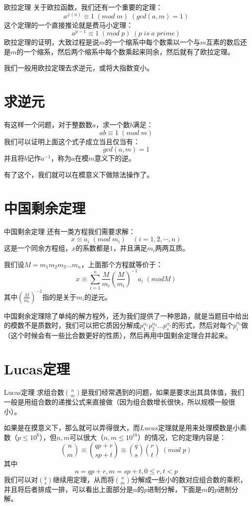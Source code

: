 \documentclass[9pt]{beamer}
\begin{document}
		\begin{frame}{欧拉定理}
			关于欧拉函数，我们还有一个重要的定理：
			$$
				a^{\varphi(n)} \equiv 1 \; (mod \; m)  \;(gcd(a,m) = 1)
			$$
			这个定理的一个直接推论就是费马小定理：
			$$
				a^{p-1} \equiv 1 \; (mod \; p) \; (p \; is \;  a \; prime)
			$$
			欧拉定理的证明，大致过程是说$m$的一个缩系中每个数乘以一个与$m$互素的数后还是$m$的一个缩系，然后两个缩系中每个数乘起来同余，然后就有了欧拉定理。
			
			我们一般用欧拉定理去求逆元，或将大指数变小。
		\end{frame} 
	\section{求逆元}  
		\begin{frame}
			有这样一个问题，对于整数数$a$，求一个数$b$满足：
			$$
			ab \equiv 1 \; (mod \; m)
			$$
			我们可以证明上面这个式子成立当且仅当有：
			$$
			gcd(a,m) = 1
			$$
			并且将$b$记作$a^{-1}$，称为$a$在模$m$意义下的逆。
			
			有了这个，我们就可以在模意义下做除法操作了。
		\end{frame}
	\section{中国剩余定理} 
		\begin{frame}{中国剩余定理} 
			还有一类方程我们需要求解：
			$$
				x \equiv a_i \; (mod \; m_i) \quad ( i = 1, 2, \cdots, n )
			$$
			这是一个同余方程组，$x$的系数都是$1$，并且满足$m_i$两两互质。
			
			我们设$M = m_1m_2m_3\dots m_n$，上面那个方程就等价于：
			$$
				x \equiv \sum_{i = 1}^{n} \frac{M}{m_i} (\frac{M}{m_i})^{-1}a_i \; (mod M)
			$$
			其中$(\frac{M}{m_i})^{-1}$指的是关于$m_i$的逆元。
			
			中国剩余定理除了单纯的解方程外，还为我们提供了一种思路，就是当题目中给出的模数不是质数时，我们可以把它质因分解成$p_1^{\alpha_1}p_2^{\alpha_2}\dots p_s^{\alpha_s}$的形式，然后对每个$p_i^{\alpha_i}$做（这个时候会有一些比合数更好的性质），然后再用中国剩余定理合并起来。
		\end{frame} 
	\section{Lucas定理}	 
		\begin{frame}{Lucas定理}	 
			求组合数$\binom{n}{m}$是我们经常遇到的问题，如果是要求出其具体值，我们一般是用组合数的递推公式来直接做（因为组合数增长很快，所以规模一般很小）。
			
			如果是在摸意义下，那么就可以弄得很大，而$Lucas$定理就是用来处理模数是小素数（$p \leq 10^6$），但$n,m$可以很大（$n,m \leq 10^{18}$）的情况，它的定理内容是：
			$$
				\binom{n}{m} \equiv \binom{qp+r}{sp+t} \equiv \binom{q}{s}\binom{r}{t} \; ( mod \; p)
			$$
			其中
			$$
				n = qp+r, m = sp+t, 0 \leq r, t < p
			$$
			我们可以对$\binom{q}{s}$继续用定理，从而将$\binom{n}{m}$分解成一些小的数对应组合数的乘积，并且将后者排成一排，可以看出上面部分是$n$的$p$进制分解，下面是$m$的$p$进制分解。
		\end{frame}
\end{document}
